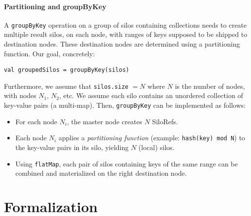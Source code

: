 \documentclass[preprint]{sigplanconf}
\theoremstyle{definition}
\theoremstyle{definition}
\begin{document}
\paragraph{Partitioning and groupByKey}

A \verb|groupByKey| operation on a group of silos containing collections needs
to create multiple result silos, on each node, with ranges of keys supposed to
be shipped to destination nodes. These destination nodes are determined using
a partitioning function. Our goal, concretely:

\begin{lstlisting}
val groupedSilos = groupByKey(silos)
\end{lstlisting}

Furthermore, we assume that \verb|silos.size| $= N$ where $N$ is the number of
nodes, with nodes $N_1$, $N_2$, etc. We assume each silo contains an unordered
collection of key-value pairs (a multi-map). Then, \verb|groupByKey| can be
implemented as follows:

\begin{itemize}
\item For each node $N_i$, the master node creates $N$ SiloRefs.

\item Each node $N_i$ applies a {\em partitioning function}
(example: \texttt{hash(key) mod N}) to the key-value pairs in its silo,
yielding $N$ (local) silos.

\item Using \verb|flatMap|, each pair of silos containing keys of the
same range can be combined and materialized on the right destination node.
\end{itemize}


\section{Formalization}
\label{sec:formalization}
\end{document}
